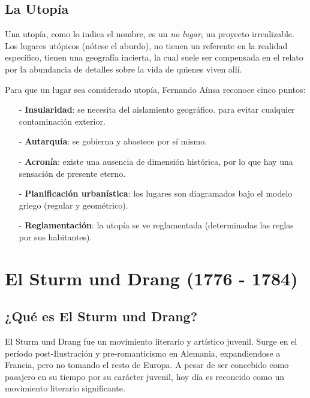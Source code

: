 \documentclass{article}
\begin{document}
\subsection{La Utopía}

Una utopía, como lo indica el nombre, es un \textit{no lugar}, un proyecto irrealizable. Los lugares utópicos (nótese el aburdo), no tienen un referente en la realidad específico, tienen una geografía incierta, la cual suele ser compensada en el relato por la abundancia de detalles sobre la vida de  quienes viven allí.

Para que un lugar sea considerado utopía, Fernando Aínsa reconoce cinco puntos:

\begin{itemize}
    \item[-] \textbf{Insularidad}: se necesita del aislamiento geográfico.
    para evitar cualquier contaminación exterior.
    \item[-] \textbf{Autarquía}: se gobierna y abastece por sí mismo.
    \item[-] \textbf{Acronía}: existe una ausencia de dimensión histórica, por lo que hay una sensación de presente eterno.
    \item[-] \textbf{Planificación urbanística}: los lugares son diagramados bajo el modelo griego (regular y geométrico).
    \item[-] \textbf{Reglamentación}: la utopía se ve reglamentada (determinadas las reglas por sus habitantes).
\end{itemize}

\section{El Sturm und Drang (1776 - 1784)}

\subsection{¿Qué es El Sturm und Drang?}

El Sturm und Drang fue un movimiento literario y artístico juvenil. Surge en el período post-Ilustración y pre-romanticismo en Alemania, expandiendose a Francia, pero no tomando el resto de Europa. A pesar de ser concebido como pasajero en su tiempo por su carácter juvenil, hoy día es reconcido como un movimiento literario significante.
\end{document}
